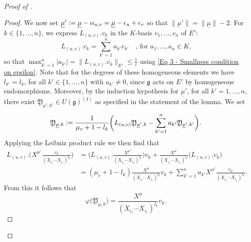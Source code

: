 \documentclass[a4paper, reqno, 10pt]{amsart}
\theoremstyle{definition}
\numberwithin{equation}{section}
\newcommand{\abs}[1]{{\lvert{#1}\rvert}}
\newcommand{\defeq}{\vcentcolon=}
\newcommand{\ul}[1]{{\underline{#1}}}
\newcommand{\Fg}{{\mathfrak {g}}}
\newcommand{\FY}{{\mathfrak {Y}}}
\begin{document}
\begin{proof}[{Proof of }]
\begin{proof}
	We now set $\ul{\mu}' \defeq \ul{\mu} - \alpha_{u,v} = \ul{\mu} -\epsilon_u + \epsilon_v$ so that $\lVert \ul{\mu}'\rVert = \lVert \ul{\mu} \rVert -2$.
	For $k \in \{1,\ldots,n\}$, we express $L_{(u,v)}.v_k$ in the $K$-basis $v_1,\ldots,v_n$ of $E'$:
	\[ L_{(u,v)}.v_k = \sum_{k'=1}^n a_{k'} v_{k'} \quad\text{, for $a_1,\ldots,a_n \in K$,} \]
	so that $\max_{k'=1}^n \abs{a_{k'}} = \lVert L_{(u,v)}.v_k \rVert_{E'} \leq \frac{1}{\varepsilon}$ using \eqref{Eq 3 - Smallness condition on epsilon}.
	Note that for the degrees of these homogeneous elements we have $l_{k'}=l_k$, for all $k'\in \{1,\ldots,n\}$ with $ a_{k'}\neq 0$, since $\Fg$ acts on $E'$ by homogeneous endomorphisms.
	Moreover, by the induction hypothesis for $\ul{\mu}'$, for all $k'=1,\ldots,n$, there exist $\FY_{\ul{\mu}',k'} \in U(\Fg)^{(I)}$ as specified in the statement of the lemma.
	We set
	\begin{equation*}
		\FY_{\ul{\mu},k} \defeq \frac{1}{\mu_v +1 - l_k} \bigg( L_{(u,v)} \FY_{\ul{\mu}',k} - \sum_{k'=1}^n a_{k'} \FY_{\ul{\mu}',k'} \bigg) .
	\end{equation*}
	Applying the Leibniz product rule we then find that
	\begin{align*}
		L_{(u,v)}.\bigg( X^{\ul{\mu}'} \frac{v_k}{(X_{i_1}\cdots X_{i_r})^{l_k}} \bigg)
			&= \bigg( L_{(u,v)}. \frac{X^{\ul{\mu}'}}{(X_{i_1}\cdots X_{i_r})^{l_k} } \bigg) v_k  + \frac{X^{\ul{\mu}'}}{(X_{i_1}\cdots X_{i_r})^{l_k} } \big(L_{(u,v)}. v_k \big) \\
			&= (\mu_v +1 - l_k) \frac{X^{\ul{\mu}}}{(X_{i_1}\cdots X_{i_r})^{l_k} } v_k + \sum_{k'=1}^n a_{k'} X^{\ul{\mu}'} \frac{v_{k'}}{(X_{i_1}\cdots X_{i_r})^{l_{k'}}} .
	\end{align*}
	From this it follows that
	\begin{equation*}
		\varphi \big( \FY_{\ul{\mu},k} \big) = \frac{X^{\ul{\mu}}}{(X_{i_1}\cdots X_{i_r})^{l_k} } v_k .
	\end{equation*}

\end{proof}
\end{proof}
\end{document}
